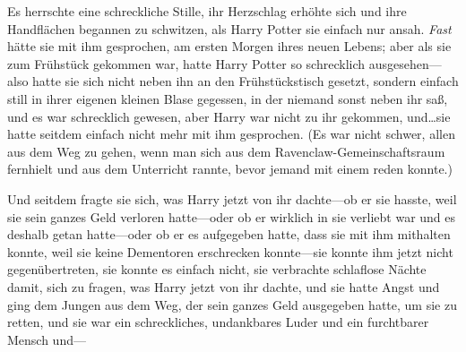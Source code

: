 Es herrschte eine schreckliche Stille, ihr Herzschlag erhöhte sich und ihre Handflächen begannen zu schwitzen, als Harry Potter sie einfach nur ansah. \emph{Fast} hätte sie mit ihm gesprochen, am ersten Morgen ihres neuen Lebens; aber als sie zum Frühstück gekommen war, hatte Harry Potter so schrecklich ausgesehen—also hatte sie sich nicht neben ihn an den Frühstückstisch gesetzt, sondern einfach still in ihrer eigenen kleinen Blase gegessen, in der niemand sonst neben ihr saß, und es war schrecklich gewesen, aber Harry war nicht zu ihr gekommen, und…sie hatte seitdem einfach nicht mehr mit ihm gesprochen.
(Es war nicht schwer, allen aus dem Weg zu gehen, wenn man sich aus dem Ravenclaw-Gemeinschaftsraum fernhielt und aus dem Unterricht rannte, bevor jemand mit einem reden konnte.)

Und seitdem fragte sie sich, was Harry jetzt von ihr dachte—ob er sie hasste, weil sie sein ganzes Geld verloren hatte—oder ob er wirklich in sie verliebt war und es deshalb getan hatte—oder ob er es aufgegeben hatte, dass sie mit ihm mithalten konnte, weil sie keine Dementoren erschrecken konnte—sie konnte ihm jetzt nicht gegenübertreten, sie konnte es einfach nicht, sie verbrachte schlaflose Nächte damit, sich zu fragen, was Harry jetzt von ihr dachte, und sie hatte Angst und ging dem Jungen aus dem Weg, der sein ganzes Geld ausgegeben hatte, um sie zu retten, und sie war ein schreckliches, undankbares Luder und ein furchtbarer Mensch und—

